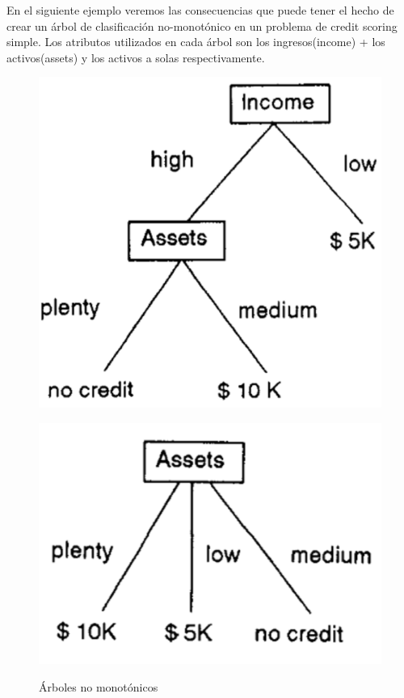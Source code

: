 En el siguiente ejemplo veremos las consecuencias que puede tener el hecho de crear un árbol de clasificación no-monotónico en un problema de credit scoring simple. Los atributos utilizados en cada árbol son los ingresos(income) + los activos(assets) y los activos a solas respectivamente. 


\begin{figure}[H]
	\centering
	\begin{minipage}{0.47\textwidth}
		\includegraphics[width=1\textwidth]{imagenes/ejAr}
		\label{fig:a}
	\end{minipage}
	\hspace{5mm}
	\begin{minipage}{0.47\textwidth}
		\includegraphics[width=1\textwidth]{imagenes/ejAr2}
		\label{fig:b}
	\end{minipage}
	\caption{Árboles no monotónicos\cite{ref14}}
\end{figure}

